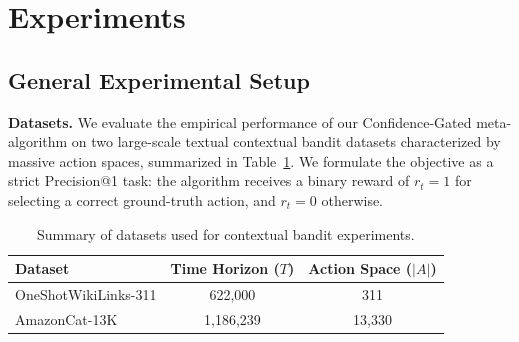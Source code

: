 
\section{Experiments}
\label{sec:experiments}

\subsection{General Experimental Setup}

\textbf{Datasets.} We evaluate the empirical performance of our Confidence-Gated meta-algorithm on two large-scale textual contextual bandit datasets characterized by massive action spaces, summarized in Table~\ref{tab:datasets}. We formulate the objective as a strict Precision@1 task: the algorithm receives a binary reward of $r_t = 1$ for selecting a correct ground-truth action, and $r_t = 0$ otherwise.

\begin{table}[h]
\centering
\caption{Summary of datasets used for contextual bandit experiments.}
\label{tab:datasets}
\begin{tabular}{@{}lcc@{}}
\toprule
\textbf{Dataset} & \textbf{Time Horizon ($T$)} & \textbf{Action Space ($|A|$)} \\ \midrule
OneShotWikiLinks-311 & 622,000 & 311 \\
AmazonCat-13K & 1,186,239 & 13,330 \\ \bottomrule
\end{tabular}
\end{table}

